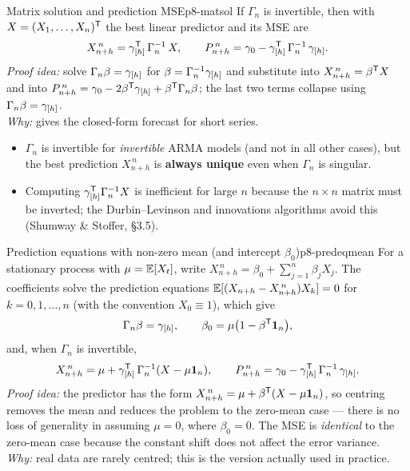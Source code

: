 \begin{corollary}{Matrix solution and prediction MSE}{p8-matsol}
If $\Gamma_n$ is invertible, then with $X=(X_1,\dots,X_n)^{\mathsf{T}}$ the best linear
predictor and its MSE are
\[
X^{\,n}_{n+h}=\gamma_{[h]}^{\mathsf{T}}\,\Gamma_n^{-1}\,X,
\qquad
P^{\,n}_{n+h}=\gamma_0-\gamma_{[h]}^{\mathsf{T}}\,\Gamma_n^{-1}\,\gamma_{[h]} .
\]
\textit{Proof idea:} solve $\Gamma_n\beta=\gamma_{[h]}$ for
$\beta=\Gamma_n^{-1}\gamma_{[h]}$ and substitute into
$X^{\,n}_{n+h}=\beta^{\mathsf{T}} X$ and into
$P^{\,n}_{n+h}=\gamma_0-2\beta^{\mathsf{T}}\gamma_{[h]}+\beta^{\mathsf{T}}\Gamma_n\beta$; the last
two terms collapse using $\Gamma_n\beta=\gamma_{[h]}$.\\[2pt]
\textit{Why:} gives the closed-form forecast for short series.
\begin{itemize}
  \item $\Gamma_n$ is invertible for \emph{invertible} ARMA models (and not in
        all other cases), but the best prediction $X^{\,n}_{n+h}$ is
        \textbf{always unique} even when $\Gamma_n$ is singular.
  \item Computing $\gamma_{[h]}^{\mathsf{T}}\Gamma_n^{-1}X$ is inefficient for large $n$
        because the $n\times n$ matrix must be inverted; the Durbin--Levinson
        and innovations algorithms avoid this (Shumway \& Stoffer, \S3.5).
\end{itemize}
\end{corollary}

\begin{theorem}{Prediction equations with non-zero mean (and intercept $\beta_0$)}{p8-predeqmean}
For a stationary process with $\mu=\mathbb{E}[X_t]$, write
$X^{\,n}_{n+h}=\beta_0+\sum_{j=1}^n\beta_j X_j$. The coefficients solve the
prediction equations $\mathbb{E}[(X_{n+h}-X^{\,n}_{n+h})X_k]=0$ for $k=0,1,\dots,n$
(with the convention $X_0\equiv1$), which give
\[
\Gamma_n\beta=\gamma_{[h]},
\qquad
\beta_0=\mu\big(1-\beta^{\mathsf{T}}\mathbf 1_n\big),
\]
and, when $\Gamma_n$ is invertible,
\[
X^{\,n}_{n+h}=\mu+\gamma_{[h]}^{\mathsf{T}}\,\Gamma_n^{-1}(X-\mu\mathbf 1_n),
\qquad
P^{\,n}_{n+h}=\gamma_0-\gamma_{[h]}^{\mathsf{T}}\,\Gamma_n^{-1}\,\gamma_{[h]} .
\]
\textit{Proof idea:} the predictor has the form
$X^{\,n}_{n+h}=\mu+\beta^{\mathsf{T}}(X-\mu\mathbf 1_n)$, so centring removes the mean and
reduces the problem to the zero-mean case --- there is no loss of generality in
assuming $\mu=0$, where $\beta_0=0$. The MSE is \emph{identical} to the
zero-mean case because the constant shift does not affect the error variance.\\[2pt]
\textit{Why:} real data are rarely centred; this is the version actually used in
practice.
\end{theorem}

